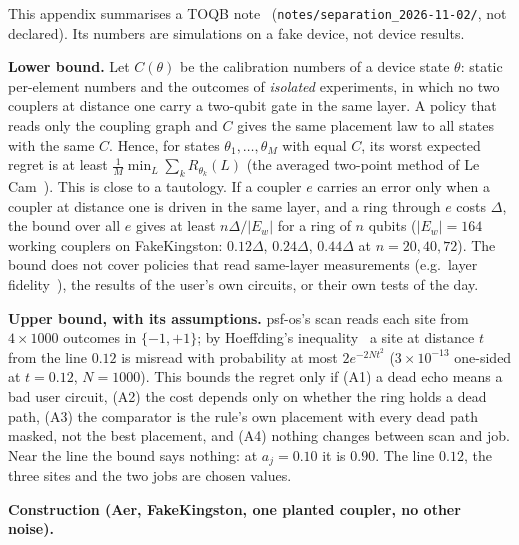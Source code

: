 \documentclass[11pt]{article}
\begin{document}
This appendix summarises a TOQB note~\cite{toqb} (\texttt{notes/separation\_2026-11-02/}, not declared). Its numbers
are simulations on a fake device, not device results.

\textbf{Lower bound.} Let $C(\theta)$ be the calibration numbers of a device state $\theta$: static per-element numbers
and the outcomes of \emph{isolated} experiments, in which no two couplers at distance one carry a two-qubit gate in
the same layer. A policy that reads only the coupling graph and $C$ gives the same placement law to all states with the
same $C$. Hence, for states $\theta_1,\dots,\theta_M$ with equal $C$, its worst expected regret is at least
$\frac1M\min_L\sum_k R_{\theta_k}(L)$ (the averaged two-point method of Le Cam~\cite{yu1997}). This is close to a
tautology. If a coupler $e$ carries an error only when a coupler at distance one is driven in the same layer, and a
ring through $e$ costs $\Delta$, the bound over all $e$ gives at least $n\Delta/|E_w|$ for a ring of $n$ qubits
($|E_w|=164$ working couplers on FakeKingston: $0.12\Delta$, $0.24\Delta$, $0.44\Delta$ at $n=20,40,72$).
The bound does not cover policies that read same-layer measurements (e.g.\ layer fidelity~\cite{mckay2023}), the
results of the user's own circuits, or their own tests of the day.

\textbf{Upper bound, with its assumptions.} psf-os's scan reads each site from $4\times1000$ outcomes in $\{-1,+1\}$;
by Hoeffding's inequality~\cite{hoeffding1963} a site at distance $t$ from the line $0.12$ is misread with probability
at most $2e^{-2Nt^2}$ ($3\times10^{-13}$ one-sided at $t=0.12$, $N=1000$). This bounds the regret only if (A1) a dead
echo means a bad user circuit, (A2) the cost depends only on whether the ring holds a dead path, (A3) the comparator is
the rule's own placement with every dead path masked, not the best placement, and (A4) nothing changes between scan and
job. Near the line the bound says nothing: at $a_j=0.10$ it is $0.90$. The line $0.12$, the three sites and the two
jobs are chosen values.

\textbf{Construction (Aer, FakeKingston, one planted coupler, no other noise).}
\end{document}
